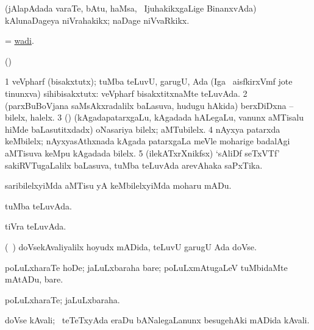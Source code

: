 \bentry
{}
\gl{\nA}
\expl{}
\bmng
(jAlapAdada varaTe, bAtu, haMsa, \mo\ IjuhakikxgaLige BinanxvAda) kAlunaDageya niVrahakikx; naDage niVvaRkikx. 
\emng
\eentry

\bentry
{} 
\gl{\nA}
\bmng
= \hyperlink{wadi}{wadi}. 
\emng
\eentry

\bentry
{}
\gl{\saMkiSx}
\expl{}
\bmng
(\ame)  
\emng
\eentry

\bentry
{}
\gl{\saMkiSx}
\expl{}
\bmng
{} 
\emng
\eentry

\bentry
{} 
\gl{\nA}
\expl{}
\bmng
\bnum
\num{1} veVpharf (bisakxtutx); tuMba teLuvU, garugU, Ada (Iga \sA\ aisfkirxVmf jote tinunxva) sihibisakxtutx:  veVpharf bisakxtitxnaMte teLuvAda. 
\num{2} (parxBuBoVjana saMsAkxradalilx baLasuva, hudugu hAkida) berxDiDxna -- bilelx, halelx. 
\num{3} (\ca) (kAgadapatarxgaLu, kAgadada hALegaLu, \mo vanunx aMTisalu hiMde baLasutitxdadx) oNasariya bilelx; aMTubilelx. 
\num{4} nAyxya patarxda keMbilelx; nAyxyasAthxnada kAgada patarxgaLa meVle moharige badalAgi aMTisuva keMpu kAgadada bilelx. 
\num{5} (ilekATxrXnikfsx) `sAliDf seTxVTf' sakiRVTugaLalilx baLasuva, tuMba teLuvAda arevAhaka saPxTika. 
\enum
\emng
\eentry

\bentry
{} 
\gl{\sakirx}
\expl{}
\bmng
saribilelxyiMda aMTisu yA keMbilelxyiMda moharu mADu. 
\emng
\eentry

\bentry
{} 
\gl{\gu}
\expl{}
\bmng
tuMba teLuvAda. 
\emng
\eentry

\bentry
{} 
\gl{\gu}
\expl{}
\bmng
tiVra teLuvAda. 
\emng
\eentry

\bentry
{} 
\gl{\nA}
\expl{}
\bmng
(\kanmu\ \ame) doVsekAvaliyalilx hoyudx mADida, teLuvU garugU Ada doVse. 
\emng
\eentry

\bentry
{} 
\gl{\akirx}
\expl{}
\bmng
poLuLxharaTe hoDe; jaLuLxbaraha bare; poLuLxmAtugaLeV tuMbidaMte mAtADu, bare. 
\emng
\eentry

\bentry
{} 
\gl{\nA}
\expl{}
\bmng
poLuLxharaTe; jaLuLxbaraha. 
\emng
\eentry

\bentry
{} 
\gl{\nA}
\expl{}
\bmng
doVse kAvali; \sA\ teTeTxyAda eraDu bANalegaLanunx besugehAki mADida kAvali. 
\emng
\eentry

